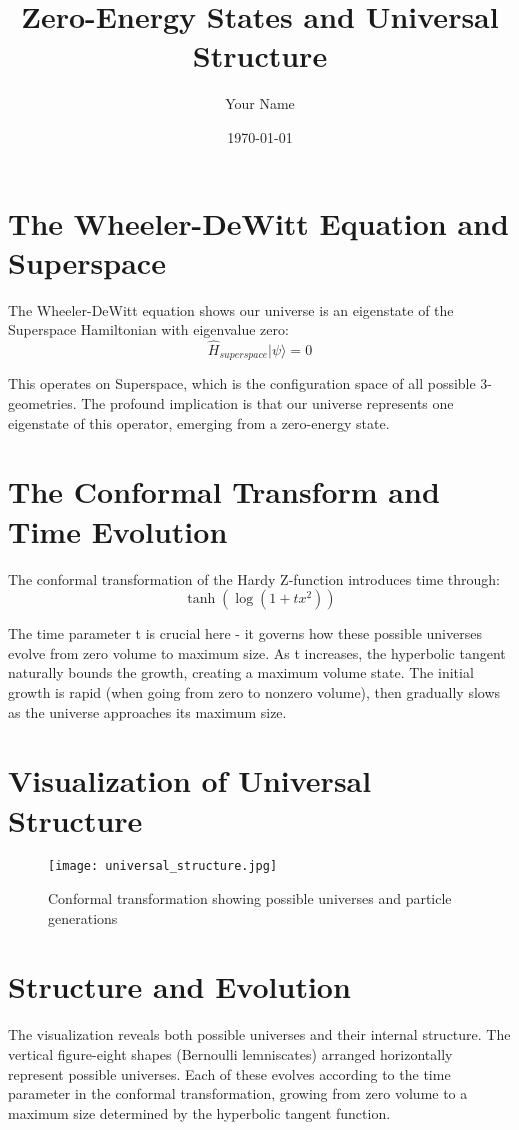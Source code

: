 \documentclass{article}
\begin{document}
\title{Zero-Energy States and Universal Structure}
\author{Your Name}
\date{\today}
\maketitle

\section{The Wheeler-DeWitt Equation and Superspace}
The Wheeler-DeWitt equation shows our universe is an eigenstate of the Superspace Hamiltonian with eigenvalue zero:
\begin{equation}
\hat{H}_{superspace}|\psi\rangle = 0
\end{equation}

This operates on Superspace, which is the configuration space of all possible 3-geometries. The profound implication is that our universe represents one eigenstate of this operator, emerging from a zero-energy state.

\section{The Conformal Transform and Time Evolution}
The conformal transformation of the Hardy Z-function introduces time through:
\begin{equation}
\tanh(\log(1 + tx^2))
\end{equation}

The time parameter t is crucial here - it governs how these possible universes evolve from zero volume to maximum size. As t increases, the hyperbolic tangent naturally bounds the growth, creating a maximum volume state. The initial growth is rapid (when going from zero to nonzero volume), then gradually slows as the universe approaches its maximum size.

\section{Visualization of Universal Structure}
\begin{figure}[h]
\centering
\texttt{[image: universal\_structure.jpg]}
\caption{Conformal transformation showing possible universes and particle generations}
\label{fig:universal_structure}
\end{figure}

\section{Structure and Evolution}
The visualization reveals both possible universes and their internal structure. The vertical figure-eight shapes (Bernoulli lemniscates) arranged horizontally represent possible universes. Each of these evolves according to the time parameter in the conformal transformation, growing from zero volume to a maximum size determined by the hyperbolic tangent function.
\end{document}

